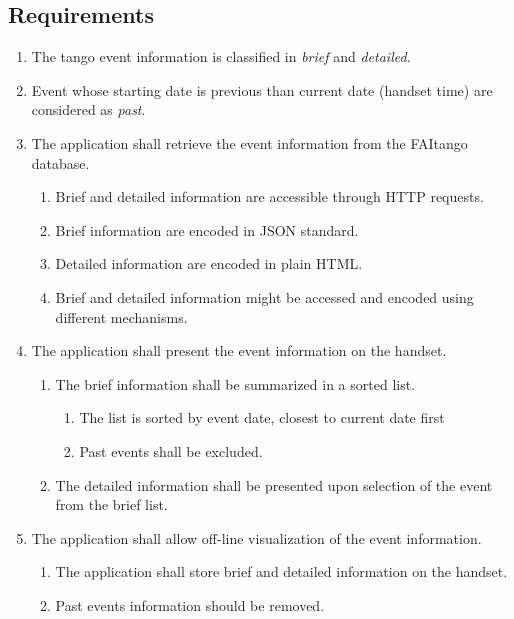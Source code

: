 \documentclass[10pt, twoside]{article}
\begin{document}
\subsection*{Requirements}
\begin{enumerate}
    \item The tango event information is classified 
          in \emph{brief} and \emph{detailed}.
    \item Event whose starting date is previous than current date 
          (handset time) are considered as \emph{past}.
    \item The application shall retrieve the event information from the 
          FAItango database.
    \begin{enumerate}
        \item Brief and detailed information are accessible through 
              HTTP requests.
        \item Brief information are encoded in JSON standard.
        \item Detailed information are encoded in plain HTML.
        \item Brief and detailed information might be accessed and encoded using
              different mechanisms.
    \end{enumerate}
    \item The application shall present the event information on the handset.
    \begin{enumerate}
        \item The brief information shall be summarized in a sorted list.
        \begin{enumerate}
            \item The list is sorted by event date, closest to current date 
                  first
            \item Past events shall be excluded.
        \end{enumerate}
        \item The detailed information shall be presented upon selection of
              the event from the brief list.
    \end{enumerate}
    \item The application shall allow off-line visualization of the event 
          information.
    \begin{enumerate}
        \item The application shall store brief and detailed information 
              on the handset.
        \item Past events information should be removed.

\end{enumerate}
\end{enumerate}
\end{document}
